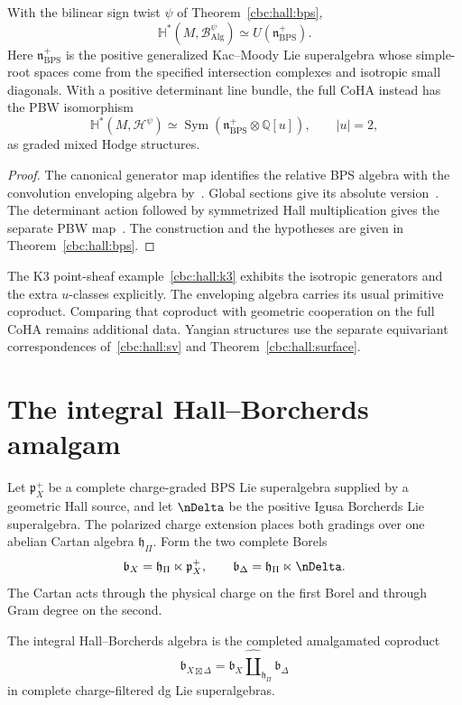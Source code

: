 \begin{theorem}
With the bilinear sign twist $\psi$ of Theorem~\ref{cbc:hall:bps},
\[
 \mathbb H^*(M,\mathscr B_{\mathrm{Alg}}^\psi)
     \simeq U(\mathfrak n^+_{\mathrm{BPS}}).
\]
Here $\mathfrak n^+_{\mathrm{BPS}}$ is the positive generalized Kac--Moody Lie superalgebra whose simple-root spaces come from the specified intersection complexes and isotropic small diagonals.
With a positive determinant line bundle, the full CoHA instead has the PBW isomorphism
\[
 \mathbb H^*(M,\mathscr H^\psi)
   \simeq\operatorname{Sym}
       (\mathfrak n^+_{\mathrm{BPS}}\otimes\mathbb Q[u]),
 \qquad |u|=2,
\]
as graded mixed Hodge structures.
\end{theorem}
\begin{proof}
The canonical generator map identifies the relative BPS algebra with the convolution enveloping algebra by~\cite[Theorem~1.1]{DHS}.
Global sections give its absolute version~\cite[Theorem~1.2]{DHS}.
The determinant action followed by symmetrized Hall multiplication gives the separate PBW map~\cite[Theorem~1.7 and Corollary~1.8]{DHS}.
The construction and the hypotheses are given in Theorem~\ref{cbc:hall:bps}.
\end{proof}

The K3 point-sheaf example~\eqref{cbc:hall:k3} exhibits the isotropic generators and the extra $u$-classes explicitly.
The enveloping algebra carries its usual primitive coproduct.
Comparing that coproduct with geometric cooperation on the full CoHA remains additional data.
Yangian structures use the separate equivariant correspondences of~\eqref{cbc:hall:sv} and Theorem~\ref{cbc:hall:surface}.

\chapter{The integral Hall--Borcherds amalgam}
Let $\mathfrak p_X^+$ be a complete charge-graded BPS Lie superalgebra supplied by a geometric Hall source, and let $\nDelta$ be the positive Igusa Borcherds Lie superalgebra.  The polarized charge extension places both gradings over one abelian Cartan algebra $\mathfrak h_\Pi$.  Form the two complete Borels
\[
 \mathfrak b_X=\mathfrak h_\Pi\ltimes\mathfrak p_X^+,
 \qquad
 \mathfrak b_\Delta=\mathfrak h_\Pi\ltimes\nDelta.
\]
The Cartan acts through the physical charge on the first Borel and through Gram degree on the second.

\begin{definition}
The integral Hall--Borcherds algebra is the completed amalgamated coproduct
\[
 \mathfrak b_{X\boxtimes\Delta}
 =\mathfrak b_X
  \widehat\amalg_{\mathfrak h_\Pi}
  \mathfrak b_\Delta
\]
in complete charge-filtered dg Lie superalgebras.
\end{definition}

